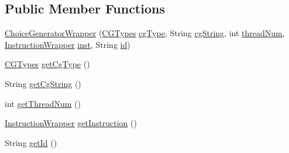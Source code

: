 \subsection*{Public Member Functions}
\begin{DoxyCompactItemize}
\item 
\hyperlink{classgov_1_1nasa_1_1jpf_1_1inspector_1_1utils_1_1_choice_generator_wrapper_a7369791801086b263994b7f6dffa4c45}{Choice\+Generator\+Wrapper} (\hyperlink{enumgov_1_1nasa_1_1jpf_1_1inspector_1_1interfaces_1_1_choice_generators_interface_1_1_c_g_types}{C\+G\+Types} \hyperlink{classgov_1_1nasa_1_1jpf_1_1inspector_1_1utils_1_1_choice_generator_wrapper_aeb97dd901024e91ef0501b520a05bb11}{cg\+Type}, String \hyperlink{classgov_1_1nasa_1_1jpf_1_1inspector_1_1utils_1_1_choice_generator_wrapper_a5f00af2fdb84e718d701dca82521b412}{cg\+String}, int \hyperlink{classgov_1_1nasa_1_1jpf_1_1inspector_1_1utils_1_1_choice_generator_wrapper_a81cb8b377c3934a700c27d479e9a822a}{thread\+Num}, \hyperlink{classgov_1_1nasa_1_1jpf_1_1inspector_1_1utils_1_1_instruction_wrapper}{Instruction\+Wrapper} \hyperlink{classgov_1_1nasa_1_1jpf_1_1inspector_1_1utils_1_1_choice_generator_wrapper_adc999b17f238d7a35ca2832844d619f3}{inst}, String \hyperlink{classgov_1_1nasa_1_1jpf_1_1inspector_1_1utils_1_1_choice_generator_wrapper_a566b7a2497dd64278ba32f03a48dab33}{id})
\item 
\hyperlink{enumgov_1_1nasa_1_1jpf_1_1inspector_1_1interfaces_1_1_choice_generators_interface_1_1_c_g_types}{C\+G\+Types} \hyperlink{classgov_1_1nasa_1_1jpf_1_1inspector_1_1utils_1_1_choice_generator_wrapper_ad1604a97683b8c6e0109386c9a1dd7c6}{get\+Cg\+Type} ()
\item 
String \hyperlink{classgov_1_1nasa_1_1jpf_1_1inspector_1_1utils_1_1_choice_generator_wrapper_a0ced02befff7d3d5795d653d56d13656}{get\+Cg\+String} ()
\item 
int \hyperlink{classgov_1_1nasa_1_1jpf_1_1inspector_1_1utils_1_1_choice_generator_wrapper_a2d8f3bbce72be2c2f8a50b541ec6cc71}{get\+Thread\+Num} ()
\item 
\hyperlink{classgov_1_1nasa_1_1jpf_1_1inspector_1_1utils_1_1_instruction_wrapper}{Instruction\+Wrapper} \hyperlink{classgov_1_1nasa_1_1jpf_1_1inspector_1_1utils_1_1_choice_generator_wrapper_aabeac1ca36e63123fa70e93ab7d38ba8}{get\+Instruction} ()
\item 
String \hyperlink{classgov_1_1nasa_1_1jpf_1_1inspector_1_1utils_1_1_choice_generator_wrapper_a6f007b920b9c1eb5f83a5c675e886f36}{get\+Id} ()
\end{DoxyCompactItemize}
